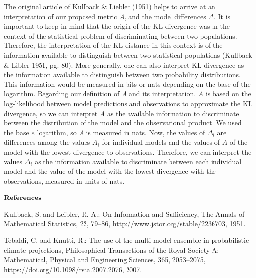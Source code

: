 The original article of Kullback \& Liebler (1951) helps to arrive at an
interpretation of our proposed metric \emph{A}, and the model
differences \(\Delta\). It is important to keep in mind that the origin
of the KL divergence was in the context of the statistical problem of
discriminating between two populations. Therefore, the interpretation of
the KL distance in this context is of the information available to
distinguish between two statistical populations (Kullback \& Libler
1951, pg. 80). More generally, one can also interpret KL divergence as
the information available to distinguish between two probability
distributions. This information would be measured in bits or nats
depending on the base of the logarithm. Regarding our definition of
\emph{A} and its interpretation. \emph{A} is based on the log-likelihood
between model predictions and observations to approximate the KL
divergence, so we can interpret \emph{A} as the available information to
discriminate between the distribution of the model and the observational
product. We used the base \(e\) logarithm, so \emph{A} is measured in
nats. Now, the values of \(\Delta_i\) are differences among the values
\(A_i\) for individual models and the values of \(A\) of the model with
the lowest divergence to observations. Therefore, we can interpret the
values \(\Delta_i\) as the information available to discriminate between
each individual model and the value of the model with the lowest
divergence with the observations, measured in units of nats.

\textbf{References}

Kullback, S. and Leibler, R. A.: On Information and Sufficiency, The
Annals of Mathematical Statistics, 22, 79--86,
http://www.jstor.org/stable/2236703, 1951.

Tebaldi, C. and Knutti, R.: The use of the multi-model ensemble in
probabilistic climate projections, Philosophical Transactions of the
Royal Society A: Mathematical, Physical and Engineering Sciences, 365,
2053--2075, https://doi.org/10.1098/rsta.2007.2076, 2007.
